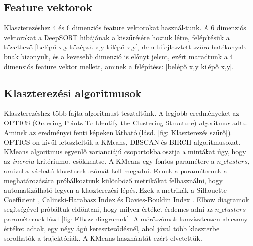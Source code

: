 \documentclass[acmtog, authorversion]{acmart}
\begin{document}
\subsection{Feature vektorok}
Klaszterezéshez 4 és 6 dimenziós feature vektorokat használ-tunk. A 6 dimenziós vektorokat a DeepSORT hibájának a kiszűrésére hoztuk
létre, felépítésük a következő [belépő x,y középső x,y kilépő x,y], de a kifejlesztett szűrő hatékonyab-bnak bizonyult, és a kevesebb dimenzió is előnyt jelent,
ezért maradtunk a 4 dimenziós feature vektor mellett, aminek a felépítése: [belépő x,y kilépő x,y].
\subsection{Klaszterezési algoritmusok}
Klaszterezéshez több fajta algoritmust teszteltünk. A legjobb eredményeket az OPTICS (Ordering Points To Identify the Clustering Structure) \cite{10.1145/304181.304187} algoritmus adta. 
Aminek az eredményei fenti képeken látható (lásd. \ref{fig: Klaszterezés szűrő}).
OPTICS-on kívül leteszteltük a KMeans, DBSCAN és BIRCH algoritmusokat. KMeans algoritmus egyenlő varianciájú csoportokba osztja a mintákat úgy,
hogy az \begin{math}inercia\end{math} kritériumot csökkentse. A KMeans egy fontos paramétere a \begin{math}n\_clusters\end{math}, amivel a várható
klaszterek számát kell megadni. Ennek a paraméternek a meghatározására próbálkoztunk különböző metrikákat felhasználni, hogy automatizálható legyen
a klaszterezési lépés. Ezek a metrikák a Silhouette Coefficient \cite{ROUSSEEUW198753}, Calinski-Harabasz Index \cite{article} és Davies-Bouldin Index \cite{4766909}.
Elbow diagramok segítségével próbáltuk eldönteni, hogy milyen értéket érdemes adni az \begin{math}n\_clusters\end{math} paraméternek lásd \ref{fig: Elbow diagramok}.
A mérőszámok konzisztensen alacsony értéket adtak, egy négy ágú kereszteződésnél, ahol jóval több klaszterbe sorolhatók a trajektóriák. A KMeans használatát
ezért elvetettük.
\end{document}
